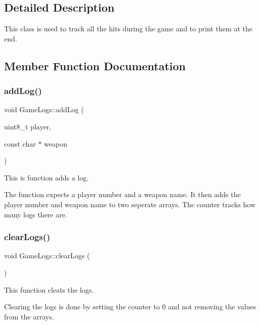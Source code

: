 \subsection{Detailed Description}
This class is used to track all the hits during the game and to print them at the end. 

\subsection{Member Function Documentation}
\mbox{\label{class_game_logs_aff50867c6abefacf3d80180015f94e70}} 
\subsubsection{\texorpdfstring{add\+Log()}{addLog()}}
{\footnotesize\ttfamily void Game\+Logs\+::add\+Log (\begin{DoxyParamCaption}\item[{uint8\+\_\+t}]{player,  }\item[{const char $\ast$}]{weapon }\end{DoxyParamCaption})\hspace{0.3cm}{\ttfamily [inline]}}



This is function adds a log. 

The function expects a player number and a weapon name. It then adds the player number and weapon name to two seperate arrays. The counter tracks how many logs there are. \mbox{\label{class_game_logs_ab645b6718f2d5ee716c8b4df4dddf561}} 
\subsubsection{\texorpdfstring{clear\+Logs()}{clearLogs()}}
{\footnotesize\ttfamily void Game\+Logs\+::clear\+Logs (\begin{DoxyParamCaption}{ }\end{DoxyParamCaption})\hspace{0.3cm}{\ttfamily [inline]}}



This function cleats the logs. 

Clearing the logs is done by setting the counter to 0 and not removing the values from the arrays. \mbox{\label{class_game_logs_a8c7dec27f1cd0c1b6df508b9e3172459}} 

